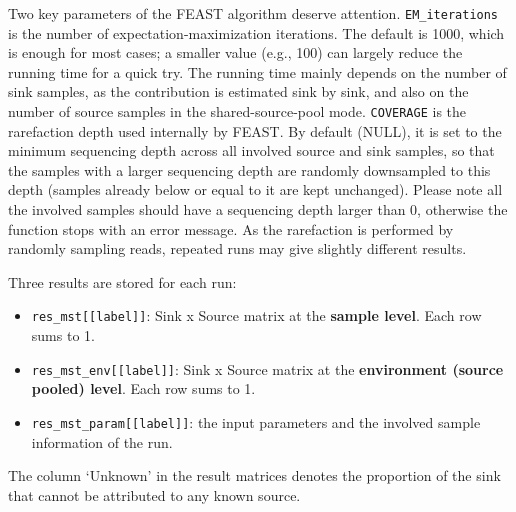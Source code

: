 \documentclass[
]{book}
\newenvironment{Shaded}{\begin{snugshade}}{\end{snugshade}}
\newcommand{\AttributeTok}[1]{\textcolor[rgb]{0.13,0.29,0.53}{#1}}
\newcommand{\DecValTok}[1]{\textcolor[rgb]{0.00,0.00,0.81}{#1}}
\newcommand{\FunctionTok}[1]{\textcolor[rgb]{0.13,0.29,0.53}{\textbf{#1}}}
\newcommand{\NormalTok}[1]{#1}
\newcommand{\SpecialCharTok}[1]{\textcolor[rgb]{0.81,0.36,0.00}{\textbf{#1}}}
\newcommand{\StringTok}[1]{\textcolor[rgb]{0.31,0.60,0.02}{#1}}
\providecommand{\tightlist}{%
  \setlength{\itemsep}{0pt}\setlength{\parskip}{0pt}}
\begin{document}
\begin{Shaded}
\end{Shaded}

Two key parameters of the FEAST algorithm deserve attention.
\texttt{EM\_iterations} is the number of expectation-maximization iterations.
The default is 1000, which is enough for most cases; a smaller value (e.g., 100) can largely reduce the running time for a quick try.
The running time mainly depends on the number of sink samples, as the contribution is estimated sink by sink,
and also on the number of source samples in the shared-source-pool mode.
\texttt{COVERAGE} is the rarefaction depth used internally by FEAST.
By default (NULL), it is set to the minimum sequencing depth across all involved source and sink samples,
so that the samples with a larger sequencing depth are randomly downsampled to this depth
(samples already below or equal to it are kept unchanged).
Please note all the involved samples should have a sequencing depth larger than 0,
otherwise the function stops with an error message.
As the rarefaction is performed by randomly sampling reads, repeated runs may give slightly different results.

Three results are stored for each run:

\begin{itemize}
\tightlist
\item
  \texttt{res\_mst{[}{[}label{]}{]}}: Sink x Source matrix at the \textbf{sample level}. Each row sums to 1.
\item
  \texttt{res\_mst\_env{[}{[}label{]}{]}}: Sink x Source matrix at the \textbf{environment (source pooled) level}. Each row sums to 1.
\item
  \texttt{res\_mst\_param{[}{[}label{]}{]}}: the input parameters and the involved sample information of the run.
\end{itemize}

The column `Unknown' in the result matrices denotes the proportion of the sink that cannot be attributed to any known source.
\end{document}
